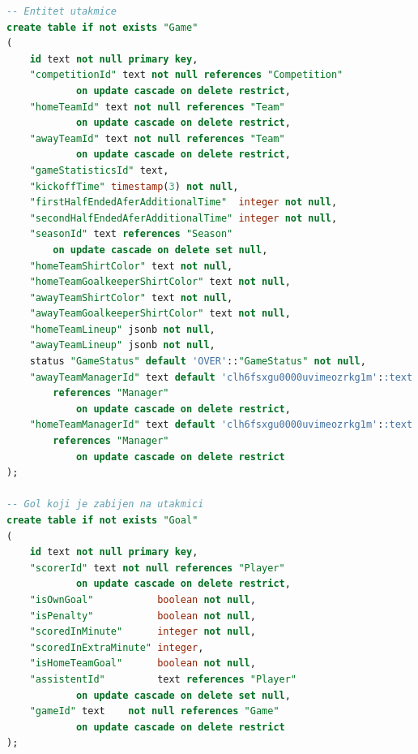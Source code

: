 \documentclass[times, utf8, zavrsni]{fer}
\begin{document}
\begin{lstlisting}[caption=Model baze podataka, language=SQL, numbers=none]
-- Entitet utakmice
create table if not exists "Game"
(
    id text not null primary key,
    "competitionId" text not null references "Competition"
            on update cascade on delete restrict,
    "homeTeamId" text not null references "Team"
            on update cascade on delete restrict,
    "awayTeamId" text not null references "Team"
            on update cascade on delete restrict,
    "gameStatisticsId" text,
    "kickoffTime" timestamp(3) not null,
    "firstHalfEndedAferAdditionalTime"  integer not null,
    "secondHalfEndedAferAdditionalTime" integer not null,
    "seasonId" text references "Season"
        on update cascade on delete set null,
    "homeTeamShirtColor" text not null,
    "homeTeamGoalkeeperShirtColor" text not null,
    "awayTeamShirtColor" text not null,
    "awayTeamGoalkeeperShirtColor" text not null,
    "homeTeamLineup" jsonb not null,
    "awayTeamLineup" jsonb not null,
    status "GameStatus" default 'OVER'::"GameStatus" not null,
    "awayTeamManagerId" text default 'clh6fsxgu0000uvimeozrkg1m'::text not null
        references "Manager"
            on update cascade on delete restrict,
    "homeTeamManagerId" text default 'clh6fsxgu0000uvimeozrkg1m'::text not null
        references "Manager"
            on update cascade on delete restrict
);

-- Gol koji je zabijen na utakmici
create table if not exists "Goal"
(
    id text not null primary key,
    "scorerId" text not null references "Player"
            on update cascade on delete restrict,
    "isOwnGoal"           boolean not null,
    "isPenalty"           boolean not null,
    "scoredInMinute"      integer not null,
    "scoredInExtraMinute" integer,
    "isHomeTeamGoal"      boolean not null,
    "assistentId"         text references "Player"
            on update cascade on delete set null,
    "gameId" text    not null references "Game"
            on update cascade on delete restrict
);


\end{lstlisting}
\end{document}
